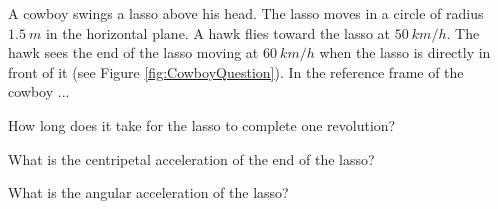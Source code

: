 \begin{problemParts}{A cowboy swings a lasso above his head. The lasso moves in a circle of radius $\SI{1.5}{m}$ in the horizontal plane. A hawk flies toward the lasso at $\SI{50}{km/h}$. The hawk sees the end of the lasso moving at $\SI{60}{km/h}$ when the lasso is directly in front of it (see Figure \ref{fig:CowboyQuestion}). In the reference frame of the cowboy ...}
\item How long does it take for the lasso to complete one revolution?
\item What is the centripetal acceleration of the end of the lasso? 
\item What is the angular acceleration of the lasso?
\end{problemParts} 


